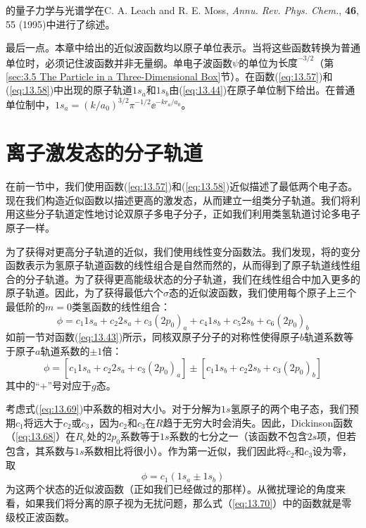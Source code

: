     的量子力学与光谱学在C. A. Leach and R. E. Moss, \textit{Annu. Rev. Phys. Chem.}, \textbf{46}, 55 (1995)中进行了综述。

    最后一点。本章中给出的近似波函数均以原子单位表示。当将这些函数转换为普通单位时，必须记住波函数并非无量纲。单电子波函数$\psi$的单位为$\text{长度}^{-3/2}$（第\ref{sec:3.5 The Particle in a Three-Dimensional Box}节）。在函数(\ref{eq:13.57})和(\ref{eq:13.58})中出现的原子轨道$1s_a$和$1s_b$由(\ref{eq:13.44})在原子单位制下给出。在普通单位制中，$1s_a = \left(k/a_0\right)^{3/2}\pi^{-1/2}\ee ^{-kr_a/a_0}$。

\section{离子激发态的分子轨道}
\label{sec:13.6 Molecular Orbitals for H2 Excited States}

    在前一节中，我们使用函数(\ref{eq:13.57})和(\ref{eq:13.58})近似描述了最低两个电子态。现在我们构造近似函数以描述更高的激发态，从而建立一组类分子轨道。我们将利用这些分子轨道定性地讨论双原子多电子分子，正如我们利用类氢轨道讨论多电子原子一样。

    为了获得对更高分子轨道的近似，我们使用线性变分函数法。我们发现，将的变分函数表示为氢原子轨道函数的线性组合是自然而然的，从而得到了原子轨道线性组合的分子轨道。为了获得更高能级状态的分子轨道，我们在线性组合中加入更多的原子轨道。因此，为了获得最低六个$\sigma$态的近似波函数，我们使用每个原子上三个最低阶的$m=0$类氢函数的线性组合：
    \begin{equation*}
        \phi = c_1 1s_a + c_2 2s_a + c_3 \left(2p_0\right)_a + c_4 1s_b + c_5 2s_b + c_6 \left(2p_0\right)_b
    \end{equation*}
    如前一节对函数(\ref{eq:13.43})所示，同核双原子分子的对称性使得原子$b$轨道系数等于原子$a$轨道系数的$\pm 1$倍：
    \begin{equation}
        \phi = \left[c_1 1s_a + c_2 2s_a + c_3\left(2p_0\right)_a\right] \pm \left[c_1 1s_b + c_2 2s_b + c_3\left(2p_0\right)_b\right]
        \label{eq:13.69}
    \end{equation}
    其中的“+”号对应于$g$态。

    考虑式(\ref{eq:13.69})中系数的相对大小。对于分解为$1s$氢原子的两个电子态，我们预期$c_1$将远大于$c_2$或$c_3$，因为$c_2$和$c_3$在$R$趋于无穷大时会消失。因此，Dickinson函数（\ref{eq:13.68}）在$R_e$处的$2p_0$系数等于$1s$系数的七分之一（该函数不包含$2s$项，但若包含，其系数与$1s$系数相比将很小）。作为第一近似，我们因此将$c_2$和$c_3$设为零，取
    \begin{equation}
        \phi = c_1\left(1s_a \pm 1s_b\right)
        \label{eq:13.70}
    \end{equation}
    为这两个状态的近似波函数（正如我们已经做过的那样）。从微扰理论的角度来看，如果我们将分离的原子视为无扰问题，那么式（\ref{eq:13.70}）中的函数就是零级校正波函数。

